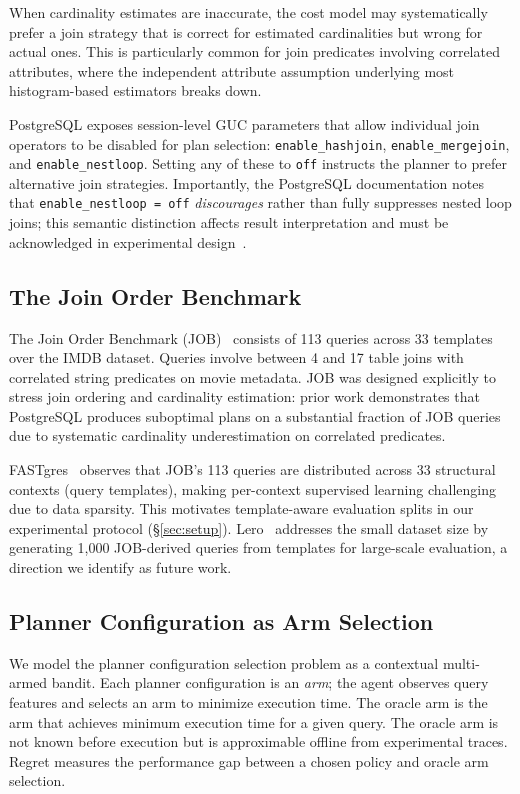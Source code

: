 \documentclass[sigconf,natbib=false]{article}
\newcommand{\postgres}{PostgreSQL}
\begin{document}
When cardinality estimates are inaccurate, the cost model may systematically prefer a join
strategy that is correct for estimated cardinalities but wrong for actual ones. This is
particularly common for join predicates involving correlated attributes, where the independent
attribute assumption underlying most histogram-based estimators breaks down.

\postgres{} exposes session-level GUC parameters that allow individual join operators to be
disabled for plan selection: \texttt{enable\_hashjoin}, \texttt{enable\_mergejoin}, and
\texttt{enable\_nestloop}. Setting any of these to \texttt{off} instructs the planner to
prefer alternative join strategies. Importantly, the \postgres{} documentation notes that
\texttt{enable\_nestloop = off} \emph{discourages} rather than fully suppresses nested loop
joins; this semantic distinction affects result interpretation and must be acknowledged in
experimental design~\cite{PGDocs}.

\subsection{The Join Order Benchmark}

The Join Order Benchmark (JOB)~\cite{Leis2015} consists of 113 queries across 33 templates
over the IMDB dataset. Queries involve between 4 and 17 table joins with correlated string
predicates on movie metadata. JOB was designed explicitly to stress join ordering and
cardinality estimation: prior work demonstrates that \postgres{} produces suboptimal plans on
a substantial fraction of JOB queries due to systematic cardinality underestimation on
correlated predicates.

FASTgres~\cite{Habich2023} observes that JOB's 113 queries are distributed across 33 structural
contexts (query templates), making per-context supervised learning challenging due to data
sparsity. This motivates template-aware evaluation splits in our experimental protocol
(\S\ref{sec:setup}). Lero~\cite{Zhu2023Lero} addresses the small dataset size by generating
1{,}000 JOB-derived queries from templates for large-scale evaluation, a direction we
identify as future work.

\subsection{Planner Configuration as Arm Selection}

We model the planner configuration selection problem as a contextual multi-armed bandit. Each
planner configuration is an \emph{arm}; the agent observes query features and selects an arm
to minimize execution time. The oracle arm is the arm that achieves minimum execution time
for a given query. The oracle arm is not known before execution but is approximable offline from experimental
traces. Regret measures the performance gap between a chosen policy and oracle arm selection.
\end{document}
